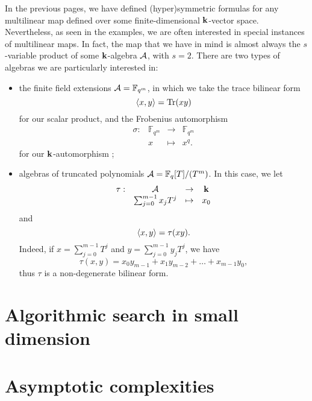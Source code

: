 In the previous pages, we have defined (hyper)symmetric formulas for any
multilinear map defined over some finite-dimensional $\mathbf{k}$-vector space.
Nevertheless, as seen in the examples, we are often interested in special
instances of multilinear maps. In fact, the map that we have in mind is almost
always the $s$-variable product of some $\mathbf{k}$-algebra $\mathcal{A}$, with $s=2$. There are
two types of algebras we are particularly interested in:
\begin{itemize}
  \item the finite field extensions $\mathcal{A}=\mathbb{F}_{q^m}$, in which we take the
    trace bilinear form
    \[
      \left\langle x,y\right\rangle=\operatorname{Tr}(xy)
    \]
    for our scalar product, and the Frobenius automorphism
    \[
  \begin{array}{cccc}
    \sigma: & \mathbb{F}_{q^m} & \to & \mathbb{F}_{q^m} \\
    & x & \mapsto & x^q.
  \end{array}
\]
for our $\mathbf{k}$-automorphism ;
\item algebras of truncated polynomials $\mathcal{A} = \mathbb{F}_q[T]/(T^m)$. In this
  case, we let 
  \[
  \begin{array}{cccc}
    \tau: & \mathcal{A} & \to & \mathbf{k} \\
    & \sum_{j=0}^{m-1}x_j T^j & \mapsto & x_0
  \end{array}
\]
and
\[
  \left\langle x,y\right\rangle = \tau(xy).
\]
Indeed, if $x=\sum_{j=0}^{m-1}T^j$ and $y=\sum_{j=0}^{m-1}y_jT^j$, we have
\[
  \tau(x, y) = x_0y_{m-1} + x_1y_{m-2} + \dots + x_{m-1}y_0,
\]
thus $\tau$ is a non-degenerate bilinear form.
\end{itemize}

\section{Algorithmic search in small dimension}
\section{Asymptotic complexities}
